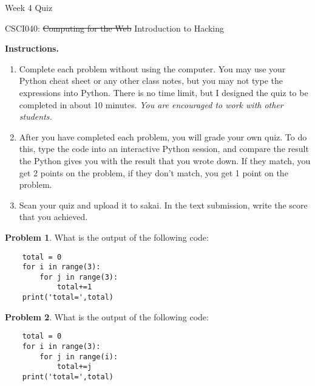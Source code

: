 \documentclass[10pt]{article}
\theoremstyle{definition}
\newtheorem{problem}{Problem}
\begin{document}
\begin{center}
    {
\Large
Week 4 Quiz
}

    \vspace{0.1in}
    CSCI040: \sout{Computing for the Web} Introduction to Hacking

    \vspace{0.1in}
\end{center}

\vspace{0.15in}
%
%

\noindent\textbf{Instructions.}
\begin{enumerate}
    \item
        Complete each problem without using the computer.  
        You may use your Python cheat sheet or any other class notes,
        but you may not type the expressions into Python.
        There is no time limit, but I designed the quiz to be completed in about 10 minutes.
        \emph{You are encouraged to work with other students.}
\item
After you have completed each problem, you will grade your own quiz.
To do this, type the code into an interactive Python session,
and compare the result the Python gives you with the result that you wrote down.
If they match, you get 2 points on the problem,
if they don't match, you get 1 point on the problem.
\item
Scan your quiz and upload it to sakai.
In the text submission, write the score that you achieved.
\end{enumerate}
\vspace{0.15in}

\begin{problem}
    What is the output of the following code:
\end{problem}
\begin{lstlisting}
    total = 0
    for i in range(3):
        for j in range(3):
            total+=1
    print('total=',total)
\end{lstlisting}
\vspace{1.5in}

\begin{problem}
    What is the output of the following code:
\end{problem}
\begin{lstlisting}
    total = 0
    for i in range(3):
        for j in range(i):
            total+=j
    print('total=',total)
\end{lstlisting}
\vspace{1.5in}
\end{document}

